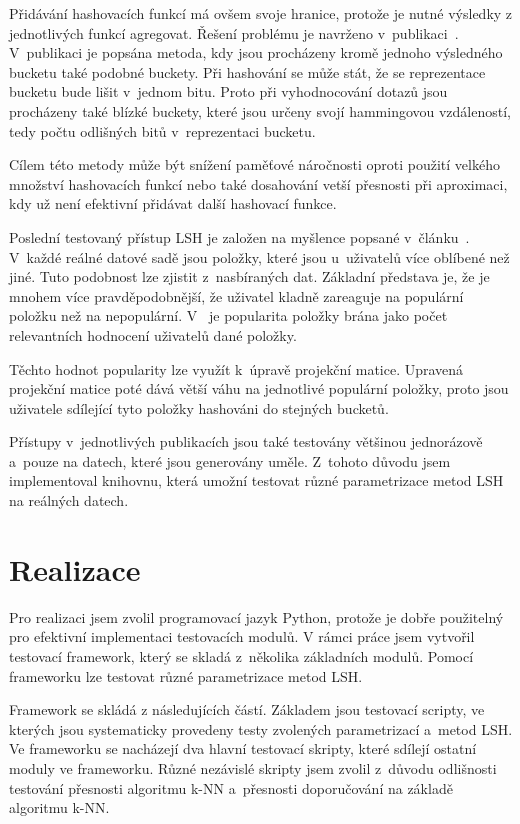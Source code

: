 \documentclass[11pt]{article}
\begin{document}
Přidávání hashovacích funkcí má ovšem svoje hranice, protože je nutné výsledky z jednotlivých funkcí agregovat. Řešení problému je navrženo v~publikaci~\cite{lv2007multi}. V~publikaci je popsána metoda, kdy jsou procházeny kromě jednoho výsledného bucketu také podobné buckety. Při hashování se může stát, že se reprezentace bucketu bude lišit v~jednom bitu. Proto při vyhodnocování dotazů jsou procházeny také blízké buckety, které jsou určeny svojí hammingovou vzdáleností, tedy počtu odlišných bitů v~reprezentaci bucketu. 

Cílem této metody může být snížení paměťové náročnosti oproti použití velkého množství hashovacích funkcí nebo také dosahování vetší přesnosti při aproximaci, kdy už není efektivní přidávat další hashovací funkce.

Poslední testovaný přístup LSH je založen na myšlence popsané v~článku~\cite{Steck:2011:IPR:2043932.2043957}. V~každé reálné datové sadě jsou položky, které jsou u~uživatelů více oblíbené než jiné. Tuto podobnost lze zjistit z~nasbíraných dat. Základní představa je, že je mnohem více pravděpodobnější, že uživatel kladně zareaguje na populární položku než na nepopulární. V~\cite{Steck:2011:IPR:2043932.2043957} je popularita položky brána jako počet relevantních hodnocení uživatelů dané položky. 

Těchto hodnot popularity lze využít k~úpravě projekční matice. Upravená projekční matice poté dává větší váhu na jednotlivé populární položky, proto jsou uživatele sdílející tyto položky hashováni do stejných bucketů.

Přístupy v~jednotlivých publikacích jsou také testovány většinou jednorázově a~pouze na datech, které jsou generovány uměle. Z~tohoto důvodu jsem implementoval knihovnu, která umožní testovat různé parametrizace metod LSH na reálných datech.

\section{Realizace}
Pro realizaci jsem zvolil programovací jazyk Python, protože je dobře použitelný pro efektivní implementaci testovacích modulů. V rámci práce jsem vytvořil testovací framework, který se skladá z~několika základních modulů. Pomocí frameworku lze testovat různé parametrizace metod LSH. 

Framework se skládá z následujících částí. Základem jsou testovací scripty, ve kterých jsou systematicky provedeny testy zvolených parametrizací a~metod LSH. Ve frameworku se nacházejí dva hlavní testovací skripty, které sdílejí ostatní moduly ve frameworku. Různé nezávislé skripty jsem zvolil z~důvodu odlišnosti testování přesnosti algoritmu k-NN a~přesnosti doporučování na základě algoritmu k-NN. 
\end{document}
